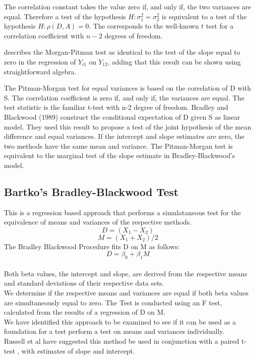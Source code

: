 \documentclass[12pt, a4paper]{report}
\theoremstyle{plain}
\theoremstyle{definition}
\theoremstyle{remark}
\begin{document}
The correlation constant takes the value zero if, and only if, the
two variances are equal. Therefore a test of the hypothesis $H:
\sigma^{2}_{1}=\sigma^{2}_{2}$ is equivalent to a test of the
hypothesis $H: \rho(D,A) = 0$. The corresponds to the well-known
$t$ test for a correlation coefficient with $n-2$ degrees of
freedom.

\citet{Bartko} describes the Morgan-Pitman test as identical to
the test of the slope equal to zero in the regression of $Y_{i1}$
on $Y_{12}$, adding that this result can be shown using
straightforward algebra.

The Pitman-Morgan test for equal variances is based on the correlation of D with S. The correlation coefficient is zero if, and only if, the variances are equal. The test statistic is the familiar t-test with n-2 degree of freedom.
Bradley and Blackwood (1989) construct the conditional expectation of D given S as linear model.  They used this result to propose a test of the joint hypothesis of the mean difference and equal variances. 
If the intercept and slope estimates are zero, the two methods have the same mean and variance.
The Pitman-Morgan test is equivalent to the marginal test of the slope estimate in Bradley-Blackwood’s model.

\subsection{Bartko's Bradley-Blackwood Test}
This is a regression based approach that performs a simulataneous
test for the equivalence of means and variances of the respective
methods.\\
\begin{equation}
D = (X_{1}-X_{2})
\end{equation}
\begin{equation}
M = (X_{1} + X_{2}) /2
\end{equation}
The Bradley Blackwood Procedure fits D on M as follows:\\
\begin{equation}
D = \beta_{0} + \beta_{1}M
\end{equation}
\\Both beta values, the intercept and slope, are derived from the respective means and
standard deviations of their respective data sets.\\
We determine if the respective means and variances are equal if
both beta values are simultaneously equal to zero. The Test is
conducted using an F test, calculated from the results of a
regression of D on M.
\\We have identified this approach  to be examined to see if it can
be used as a foundation for a test perform a test on means and
variances individually.\\
Russell et al have suggested this method be used in conjunction
with a paired t-test , with estimates of slope and intercept.
\end{document}
